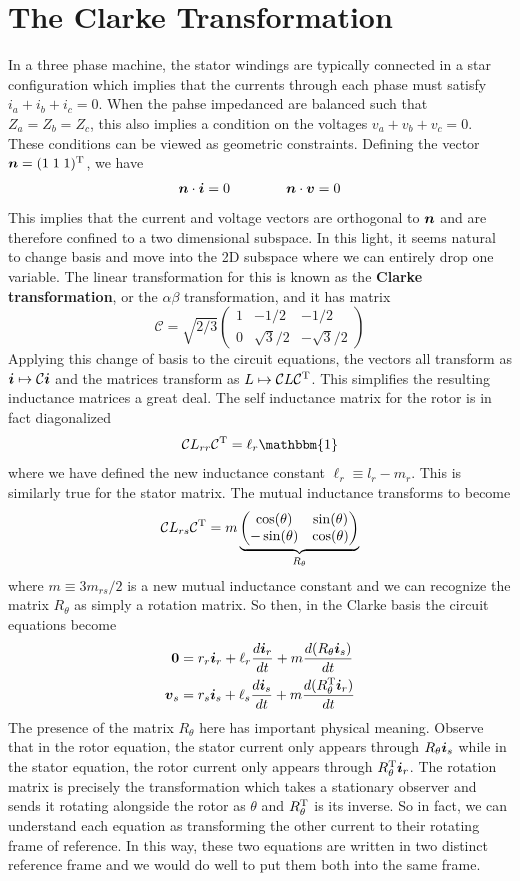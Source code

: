 \documentclass[onecolumn]{gwclass}
\begin{document}
\section{The Clarke Transformation}
In a three phase machine, the stator windings are typically connected in a star configuration which implies that the currents through each phase must satisfy $i_a+i_b+i_c=0$. When the pahse impedanced are balanced such that $Z_a=Z_b=Z_c$, this also implies a condition on the voltages $ v_a+v_b+v_c=0 $. These conditions can be viewed as geometric constraints. Defining the vector $\boldsymbol{n}=(1\;1\;1)^{\text{\normalfont{T}}}$, we have
$$ \boldsymbol{n}\cdot\boldsymbol{i} = 0 \qquad\qquad \boldsymbol{n}\cdot\boldsymbol{v}=0 $$
This implies that the current and voltage vectors are orthogonal to $\boldsymbol{n}$ and are therefore confined to a two dimensional subspace. In this light, it seems natural to change basis and move into the 2D subspace where we can entirely drop one variable. The linear transformation for this is known as the \textbf{Clarke transformation}, or the $\alpha\beta$ transformation, and it has matrix 
$$ \mathcal{C} = \sqrt{2/3}\begin{pmatrix}
	1 & -1/2 & -1/2\\
	0 & \sqrt{3}/2 & -\sqrt{3}/2
\end{pmatrix} $$
Applying this change of basis to the circuit equations, the vectors all transform as $\boldsymbol{i}\mapsto \mathcal{C}\boldsymbol{i}$ and the matrices transform as $L\mapsto\mathcal{C}L\mathcal{C}^{\text{\normalfont{T}}}$. This simplifies the resulting inductance matrices a great deal. The self inductance matrix for the rotor is in fact diagonalized
$$ \mathcal{C}L_{rr}\mathcal{C}^\t{T} = \ell_r\mathbbm{1} $$
where we have defined the new inductance constant $\ell_r\equiv l_r-m_r$. This is similarly true for the stator matrix. The mutual inductance transforms to become
$$ \mathcal{C}L_{rs}\mathcal{C}^{\text{\normalfont{T}}} =m\underbrace{\begin{pmatrix}
	\cos(\theta) & \sin(\theta) \\
	-\sin(\theta) & \cos(\theta)
\end{pmatrix}}_{R_\theta} $$
where $m\equiv 3m_{rs}/2$ is a new mutual inductance constant and we can recognize the matrix $R_\theta$ as simply a rotation matrix. So then, in the Clarke basis the circuit equations become
\begin{align*}
	\boldsymbol{0} &= r_r\boldsymbol{i}_r + \ell_r\frac{d\boldsymbol{i}_r}{dt} + m\frac{d(R_\theta\boldsymbol{i}_s)}{dt} \\
	\boldsymbol{v}_s &= r_s\boldsymbol{i}_s + \ell_s\frac{d\boldsymbol{i}_s}{dt} + m\frac{d(R_\theta^{\text{\normalfont{T}}}\boldsymbol{i}_r)}{dt}
\end{align*}
The presence of the matrix $R_\theta$ here has important physical meaning. Observe that in the rotor equation, the stator current only appears through $R_\theta\boldsymbol{i}_s$ while in the stator equation, the rotor current only appears through $R_\theta^{\text{\normalfont{T}}}\boldsymbol{i}_r$. The rotation matrix is precisely the transformation which takes a stationary observer and sends it rotating alongside the rotor as $\theta$ and $R_\theta^{\text{\normalfont{T}}}$ is its inverse. So in fact, we can understand each equation as transforming the other current to their rotating frame of reference. In this way, these two equations are written in two distinct reference frame and we would do well to put them both into the same frame. 
\end{document}
